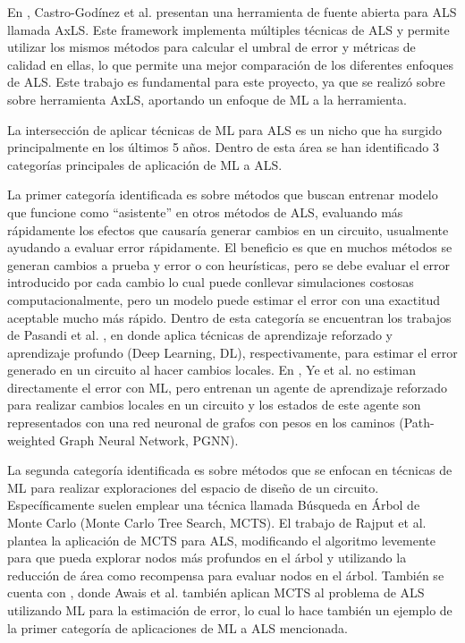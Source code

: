 En \cite{castro-godinez_axls_2021}, Castro-Godínez et al. presentan una
herramienta de fuente abierta para ALS llamada AxLS. Este framework implementa
múltiples técnicas de ALS y permite utilizar los mismos métodos para calcular
el umbral de error y métricas de calidad en ellas, lo que permite una mejor
comparación de los diferentes enfoques de ALS. Este trabajo es fundamental para
este proyecto, ya que se realizó sobre sobre herramienta AxLS, aportando un
enfoque de ML a la herramienta.

La intersección de aplicar técnicas de ML para ALS es un nicho que ha surgido
principalmente en los últimos 5 años. Dentro de esta área se han identificado 3
categorías principales de aplicación de ML a ALS.

La primer categoría identificada es sobre métodos que buscan entrenar modelo
que funcione como ``asistente'' en otros métodos de ALS, evaluando más
rápidamente los efectos que causaría generar cambios en un circuito, usualmente
ayudando a evaluar error rápidamente. El beneficio es que en muchos métodos se
generan cambios a prueba y error o con heurísticas, pero se debe evaluar el
error introducido por cada cambio lo cual puede conllevar simulaciones costosas
computacionalmente, pero un modelo puede estimar el error con una exactitud
aceptable mucho más rápido. Dentro de esta categoría se encuentran los trabajos
de Pasandi et al. \cite{pasandi_approximate_2019}
\cite{pasandi_deep-powerx_2020}, en donde aplica técnicas de aprendizaje
reforzado y aprendizaje profundo (Deep Learning, DL),
respectivamente, para estimar el error generado en un circuito al hacer cambios
locales. En \cite{ye_timing-driven_2024}, Ye et al. no estiman directamente el
error con ML, pero entrenan un agente de aprendizaje reforzado para realizar
cambios locales en un circuito y los estados de este agente son representados
con una red neuronal de grafos con pesos en los caminos (Path-weighted Graph
Neural Network, PGNN).

La segunda categoría identificada es sobre métodos que se enfocan en técnicas
de ML para realizar exploraciones del espacio de diseño de un circuito.
Específicamente suelen emplear una técnica llamada Búsqueda en Árbol de Monte
Carlo (Monte Carlo Tree Search, MCTS). El trabajo de Rajput et al.
\cite{rajput_improved_2023} plantea la aplicación de MCTS para ALS, modificando
el algoritmo levemente para que pueda explorar nodos más profundos en el árbol
y utilizando la reducción de área como recompensa para evaluar nodos en el
árbol. También se cuenta con \cite{awais_deepapprox_2024}, donde Awais et al.
también aplican MCTS al problema de ALS utilizando ML para la estimación de
error, lo cual lo hace también un ejemplo de la primer categoría de
aplicaciones de ML a ALS mencionada.

